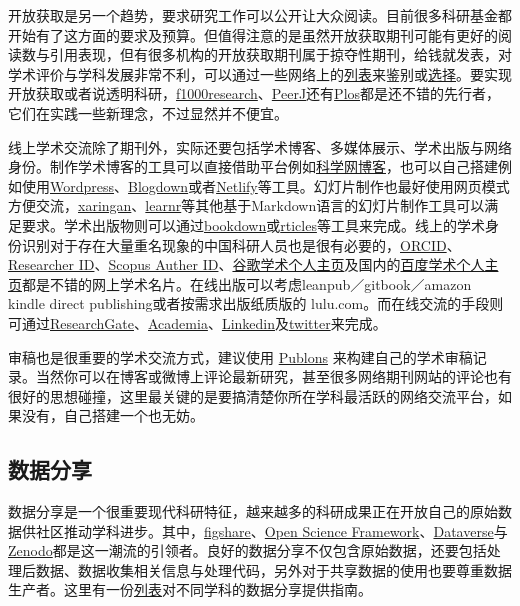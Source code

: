 \documentclass[]{tufte-book}
\begin{document}
开放获取是另一个趋势，要求研究工作可以公开让大众阅读。目前很多科研基金都开始有了这方面的要求及预算。但值得注意的是虽然开放获取期刊可能有更好的阅读数与引用表现，但有很多机构的开放获取期刊属于掠夺性期刊，给钱就发表，对学术评价与学科发展非常不利，可以通过一些网络上的\href{https://beallslist.net/}{列表}来鉴别或\href{https://doaj.org}{选择}。要实现开放获取或者说透明科研，\href{https://f1000research.com/}{f1000research}、\href{https://peerj.org/}{PeerJ}还有\href{https://www.plos.org/}{Plos}都是还不错的先行者，它们在实践一些新理念，不过显然并不便宜。

线上学术交流除了期刊外，实际还要包括学术博客、多媒体展示、学术出版与网络身份。制作学术博客的工具可以直接借助平台例如\href{http://blog.sciencenet.cn/}{科学网博客}，也可以自己搭建例如使用\href{https://zh-cn.wordpress.com/}{Wordpress}、\href{https://bookdown.org/yihui/blogdown/}{Blogdown}或者\href{https://www.netlify.com/}{Netlify}等工具。幻灯片制作也最好使用网页模式方便交流，\href{https://github.com/yihui/xaringan}{xaringan}、\href{https://rstudio.github.io/learnr/}{learnr}等其他基于Markdown语言的幻灯片制作工具可以满足要求。学术出版物则可以通过\href{https://bookdown.org/}{bookdown}或\href{https://github.com/rstudio/rticles}{rticles}等工具来完成。线上的学术身份识别对于存在大量重名现象的中国科研人员也是很有必要的，\href{https://orcid.org/}{ORCID}、\href{http://www.researcherid.com/}{Researcher ID}、\href{https://www.scopus.com/}{Scopus Auther ID}、\href{https://scholar.google.com}{谷歌学术个人主页}及国内的\href{https://xueshu.baidu.com/}{百度学术个人主页}都是不错的网上学术名片。在线出版可以考虑leanpub／gitbook／amazon kindle direct publishing或者按需求出版纸质版的 lulu.com。而在线交流的手段则可通过\href{https://www.researchgate.net/}{ResearchGate}、\href{https://www.academia.edu/}{Academia}、\href{https://www.linkedin.com/}{Linkedin}及\href{https://twitter.com/}{twitter}来完成。

审稿也是很重要的学术交流方式，建议使用 \href{https://publons.com/home/}{Publons} 来构建自己的学术审稿记录。当然你可以在博客或微博上评论最新研究，甚至很多网络期刊网站的评论也有很好的思想碰撞，这里最关键的是要搞清楚你所在学科最活跃的网络交流平台，如果没有，自己搭建一个也无妨。

\hypertarget{ux6570ux636eux5206ux4eab}{%
\subsection*{数据分享}\label{ux6570ux636eux5206ux4eab}}

数据分享是一个很重要现代科研特征，越来越多的科研成果正在开放自己的原始数据供社区推动学科进步。其中，\href{https://figshare.com/}{figshare}、\href{https://osf.io/}{Open Science Framework}、\href{https://dataverse.org/}{Dataverse}与\href{https://zenodo.org/}{Zenodo}都是这一潮流的引领者。良好的数据分享不仅包含原始数据，还要包括处理后数据、数据收集相关信息与处理代码，另外对于共享数据的使用也要尊重数据生产者。这里有一份\href{https://www.nature.com/sdata/policies/repositories}{列表}对不同学科的数据分享提供指南。
\end{document}
